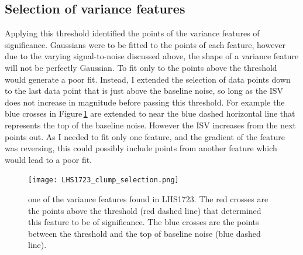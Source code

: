 \subsection{Selection of variance features}
\label{secVarFeature}
Applying this threshold identified the points of the variance features of significance. Gaussians were to be fitted to the points of each feature, however due to the varying signal-to-noise discussed above, the shape of a variance feature will not be perfectly Gaussian. To fit only to the points above the threshold would generate a poor fit. Instead, I extended the selection of data points down to the last data point that is just above the baseline noise, so long as the ISV does not increase in magnitude before passing this threshold. For example the blue crosses in Figure\,\ref{figLHS1723_clump} are extended to near the blue dashed horizontal line that represents the top of the baseline noise. However the ISV increases from the next points out. As I needed to fit only one feature, and the gradient of the feature was reversing, this could possibly include points from another feature which would lead to a poor fit.\\

\begin{figure}
	\centering
	\captionsetup{width=.8\textwidth}
    \texttt{[image: LHS1723\_clump\_selection.png]}
    \caption{one of the variance features found in LHS1723. The red crosses are the points above the threshold (red dashed line) that determined this feature to be of significance. The blue crosses are the points between the threshold and the top of baseline noise (blue dashed line).}
    \label{figLHS1723_clump}
\end{figure}

